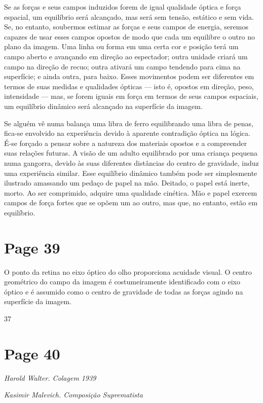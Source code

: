 \documentclass[a4paper]{article}
\begin{document}
Se as forças e seus campos induzidos forem de igual qualidade óptica e força espacial, um equilíbrio será alcançado, mas será sem tensão, estático e sem vida. Se, no entanto, soubermos estimar as forças e seus campos de energia, seremos capazes de usar esses campos opostos de modo que cada um equilibre o outro no plano da imagem. Uma linha ou forma em uma certa cor e posição terá um campo aberto e avançando em direção ao espectador; outra unidade criará um campo na direção de recuo; outra ativará um campo tendendo para cima na superfície; e ainda outra, para baixo. Esses movimentos podem ser diferentes em termos de suas medidas e qualidades ópticas --- isto é, opostos em direção, peso, intensidade --- mas, se forem iguais em força em termos de seus campos espaciais, um equilíbrio dinâmico será alcançado na superfície da imagem.

Se alguém vê numa balança uma libra de ferro equilibrando uma libra de penas, fica-se envolvido na experiência devido à aparente contradição óptica na lógica. É-se forçado a pensar sobre a natureza dos materiais opostos e a compreender suas relações futuras. A visão de um adulto equilibrado por uma criança pequena numa gangorra, devido às suas diferentes distâncias do centro de gravidade, induz uma experiência similar. Esse equilíbrio dinâmico também pode ser simplesmente ilustrado amassando um pedaço de papel na mão. Deitado, o papel está inerte, morto. Ao ser comprimido, adquire uma qualidade cinética. Mão e papel exercem campos de força fortes que se opõem um ao outro, mas que, no entanto, estão em equilíbrio.

\newpage
\section*{Page 39}

O ponto da retina no eixo óptico do olho proporciona acuidade visual. O centro geométrico do campo da imagem é costumeiramente identificado com o eixo óptico e é assumido como o centro de gravidade de todas as forças agindo na superfície da imagem.

\vfill
\hfill 37

\newpage
\section*{Page 40}

\textit{Harold Walter. Colagem 1939}

\textit{Kasimir Malevich. Composição Suprematista}
\end{document}
